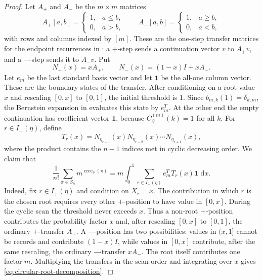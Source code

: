 \documentclass[11pt,letterpaper,reqno]{amsart}
\theoremstyle{definition}
\newcommand{\dd}{\,\mathrm{d}}
\begin{document}
\begin{proof}
Let \(A_+\) and \(A_-\) be the \(m\times m\) matrices
\[
A_+[a,b]=
\begin{cases}
1,&a\le b,\\
0,&a>b,
\end{cases}
\qquad
A_-[a,b]=
\begin{cases}
1,&a\ge b,\\
0,&a<b,
\end{cases}
\]
with rows and columns indexed by \([m]\).  These are the one-step transfer
matrices for the endpoint recurrences in : a
\(+\)-step sends a continuation vector \(v\) to \(A_+v\), and a \(-\)-step
sends it to \(A_-v\).  Put
\[
N_+(x)=xA_+,
\qquad
N_-(x)=(1-x)I+xA_-.
\]
Let \(e_m\) be the last standard basis vector and let \(\mathbf 1\) be the
all-one column vector.  These are the boundary states of the transfer.  After
conditioning on a root value \(x\) and rescaling \([0,x]\) to \([0,1]\), the
initial threshold is \(1\).  Since \(b_{m,k}(1)=\delta_{k,m}\), the Bernstein
expansion in  evaluates this state by \(e_m^T\).  At the
other end the empty continuation has coefficient vector \(\mathbf 1\), because
\(C_\varnothing^{(m)}(k)=1\) for all \(k\).  For \(r\in I_+(\eta)\), define
\[
T_r(x)=N_{\eta_{r-1}}(x)N_{\eta_{r-2}}(x)\cdots
N_{\eta_{r+1}}(x),
\]
where the product contains the \(n-1\) indices met in cyclic decreasing
order.
We claim that
\begin{equation}\label{eq:circular-root-decomposition}
\frac1{n!}\sum_{\pi\in S_n}m^{\operatorname{crec}_\eta(\pi)}
=
m\int_0^1\sum_{r\in I_+(\eta)} e_m^T T_r(x)\mathbf 1\,\dd x .
\end{equation}
Indeed, fix \(r\in I_+(\eta)\) and condition on \(X_r=x\).  The contribution in
which \(r\) is the chosen root requires every other \(+\)-position to have value
in \([0,x]\).  During the cyclic scan the threshold never exceeds \(x\).  Thus a
non-root \(+\)-position contributes the probability factor \(x\) and, after
rescaling \([0,x]\) to \([0,1]\), the ordinary \(+\)-transfer \(A_+\).  A
\(-\)-position has two possibilities: values in \((x,1]\) cannot be records and
contribute \((1-x)I\), while values in \([0,x]\) contribute, after the same
rescaling, the ordinary \(-\)-transfer \(xA_-\).  The root itself contributes
one factor \(m\).  Multiplying the transfers in the scan order and integrating
over \(x\) gives \eqref{eq:circular-root-decomposition}.


\end{proof}
\end{document}
